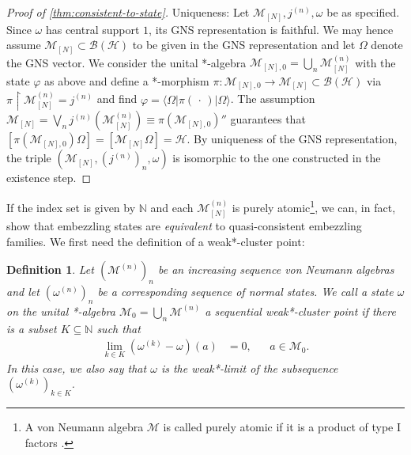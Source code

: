 \documentclass[a4paper, 10pt, onecolumn, accepted=2025-07-22]{quantumarticle}
\newtheorem{definition}[theorem]{Definition}
\theoremstyle{definition}
\newcommand{\ket}[1]{|#1\rangle}
\newcommand{\bra}[1]{\langle#1|}
\newcommand{\mc}{\mathcal}
\def\B{{\mc B}}
\def\H{{\mc H}}
\def\M{{\mc M}}
\def\NN{{\mathbb N}}
\newcommand*{\1}{\text{\usefont{U}{bbold}{m}{n}1}}
\newcommand{\placeholder}[0]{{\,\cdot\,}}
\begin{document}
\begin{proof}[Proof of \cref{thm:consistent-to-state}]
    Uniqueness:
    Let $\M_{[N]}, j^{(n)}, \omega$ be as specified.
    Since $\omega$ has central support $1$, its GNS representation is faithful.
    We may hence assume $\M_{[N]}\subset \B(\H)$ to be given in the GNS representation and let $\Omega$ denote the GNS vector. 
    We consider the unital *-algebra $\M_{[N],0}= \bigcup_n\M^{(n)}_{[N]}$ with the state $\varphi$ as above and define a *-morphism $\pi:\M_{[N],0}\to \M_{[N]}\subset\B(\H)$ via $\pi\upharpoonright \M^{(n)}_{[N]}=j^{(n)}$ and find $\varphi = \bra\Omega\pi(\placeholder)\ket\Omega$.
    The assumption $\M_{[N]} = \bigvee_n j^{(n)}(\M^{(n)}_{[N]}) \equiv \pi(\M_{[N],0})''$ guarantees that $[\pi(\M_{[N],0})\Omega] = [\M_{[N]}\Omega]=\H$.
    By uniqueness of the GNS representation, the triple $(\M_{[N]},(j^{(n)})_n,\omega)$ is isomorphic to the one constructed in the existence step.    
\end{proof}

If the index set is given by $\NN$ and each $\M^{(n)}_{[N]}$ is purely atomic\footnote{A von Neumann algebra $\M$ is called purely atomic if it is a product of type I factors \cite{blackadar_operator_2006}.}, we can, in fact, show that embezzling states are \emph{equivalent} to quasi-consistent embezzling families. 
We first need the definition of a weak*-cluster point:

\begin{definition}\label{def:weak_star_cluster}
    Let $(\M^{(n)})_{n}$ be an increasing sequence von Neumann algebras and let $(\omega^{(n)})_{n}$ be a corresponding sequence of normal states. 
    We call a state $\omega$ on the unital *-algebra $\M_{0} = \bigcup_{n}\M^{(n)}$ a sequential weak*-cluster point if there is a subset $K\subseteq\NN$ such that
    \begin{align}
        \lim_{k\in K}(\omega^{(k)}-\omega)(a) & = 0, &  &  a\in\M_{0}.
        \end{align}
    In this case, we also say that $\omega$ is the weak*-limit of the subsequence $(\omega^{(k)})_{k\in K}$.
\end{definition}
\end{document}
